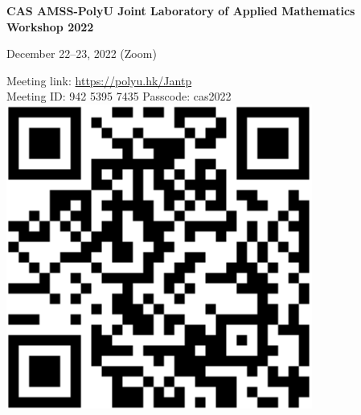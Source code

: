 \documentclass[
	openany, %
	parskip=full, %
	12pt, %
	a4paper, %
]{conferencebooklet} %
\begin{document}
\vspace*{3cm}
\begin{center}

%
%


\thispagestyle{empty}
\LARGE\textbf{CAS AMSS-PolyU Joint Laboratory of Applied Mathematics Workshop 2022}




\vspace*{2cm}
\Large

December 22--23, 2022 (Zoom)

Meeting link: \url{https://polyu.hk/Jantp}\\
\vspace{0.5cm}
Meeting ID: 942 5395 7435 \quad Passcode: cas2022\\
\vspace{1cm}
\includegraphics[scale=0.5]{qrcode.png}

\end{center}




\setcounter{page}{0}



\end{document}
